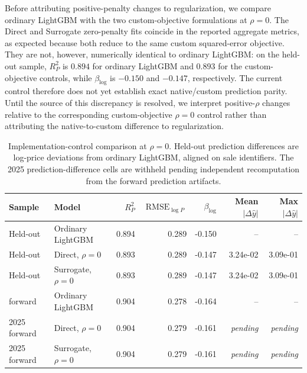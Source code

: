 \documentclass[10pt]{article}
\theoremstyle{definition}
\newcommand{\1}{\mathbf{1}}
\begin{document}
Before attributing positive-penalty changes to regularization, we compare ordinary
LightGBM with the two custom-objective formulations at $\rho=0$. The Direct and
Surrogate zero-penalty fits coincide in the reported aggregate metrics, as expected
because both reduce to the same custom squared-error objective. They are not,
however, numerically identical to ordinary LightGBM: on the held-out sample,
$R^2_P$ is $0.894$ for ordinary LightGBM and $0.893$ for the custom-objective
controls, while $\beta_{\log}$ is $-0.150$ and $-0.147$, respectively. The current
control therefore does not yet establish exact native/custom prediction parity.
Until the source of this discrepancy is resolved, we interpret positive-$\rho$
changes relative to the corresponding custom-objective $\rho=0$ control rather
than attributing the native-to-custom difference to regularization.

\begin{table}[!ht]
\centering
\caption{Implementation-control comparison at $\rho=0$. Held-out prediction differences are log-price deviations from ordinary LightGBM, aligned on sale identifiers. The 2025 prediction-difference cells are withheld pending independent recomputation from the forward prediction artifacts.}
\label{tab:rho_zero_control}
\begin{tabular}{llrrrrr}
\toprule
Sample & Model & $R^2_P$ & $\operatorname{RMSE}_{\log P}$ & $\beta_{\log}$ & Mean $|\Delta\widehat y|$ & Max $|\Delta\widehat y|$ \\
\midrule
Held-out & Ordinary LightGBM & 0.894 & 0.289 & -0.150 & -- & -- \\
Held-out & Direct, $\rho=0$ & 0.893 & 0.289 & -0.147 & 3.24e-02 & 3.09e-01 \\
Held-out & Surrogate, $\rho=0$ & 0.893 & 0.289 & -0.147 & 3.24e-02 & 3.09e-01 \\
\addlinespace
2025 forward & Ordinary LightGBM & 0.904 & 0.278 & -0.164 & -- & -- \\
2025 forward & Direct, $\rho=0$ & 0.904 & 0.279 & -0.161 & \textit{pending} & \textit{pending} \\
2025 forward & Surrogate, $\rho=0$ & 0.904 & 0.279 & -0.161 & \textit{pending} & \textit{pending} \\
\bottomrule
\end{tabular}
\end{table}

\end{document}
